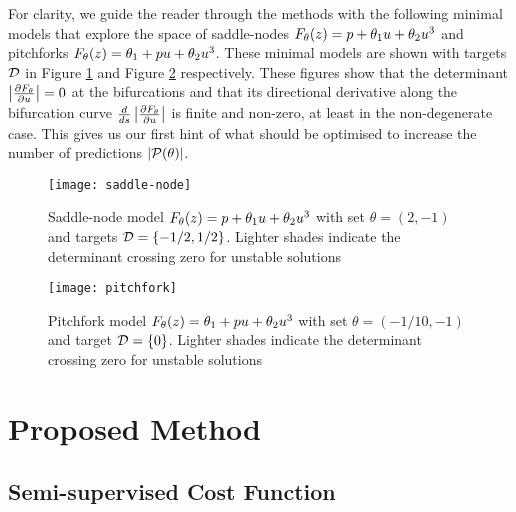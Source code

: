 For clarity, we guide the reader through the methods with the following minimal models that explore the space of saddle-nodes $F_{\theta}(z) = p + \theta_{1}u+\theta_{2}u^3$ and pitchforks $F_{\theta}(z) = \theta_{1} + p u+\theta_{2}u^3$. These minimal models are shown with targets $\mathcal{D}$ in Figure \ref{fig:saddle-node} and Figure \ref{fig:pitchfork} respectively. These figures show that the determinant $\left| \frac{\partial F_{\theta}}{\partial u} \right|=0$ at the bifurcations and that its directional derivative along the bifurcation curve $\frac{d}{ds}\left| \frac{\partial F_{\theta}}{\partial u} \right|$ is finite and non-zero, at least in the non-degenerate case. This gives us our first hint of what should be optimised to increase the number of predictions $|\mathcal{P}(\theta)|$.

\begin{figure}
\centering
\texttt{[image: saddle-node]}
\caption{Saddle-node model $F_{\theta}(z) = p + \theta_{1}u+\theta_{2}u^3$ with set $\theta=(2,-1)$ and targets $\mathcal{D}=\{-1/2,1/2\}$. Lighter shades indicate the determinant crossing zero for unstable solutions}
\label{fig:saddle-node}
\end{figure}

\begin{figure}
\centering
\texttt{[image: pitchfork]}
\caption{Pitchfork model $F_{\theta}(z) = \theta_{1} + p u+\theta_{2}u^3$ with set $\theta=(-1/10,-1)$ and target $\mathcal{D}=\{0\}$. Lighter shades indicate the determinant crossing zero for unstable solutions}
\label{fig:pitchfork}
\end{figure}

\section{Proposed Method}

\subsection{Semi-supervised Cost Function}


